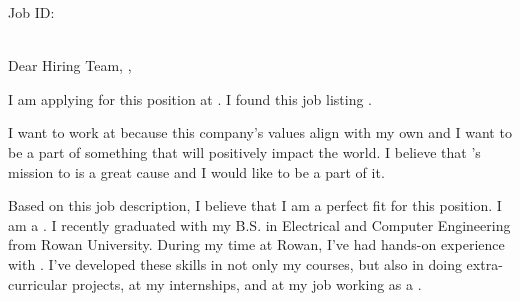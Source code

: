 \documentclass[11pt]{letter} %
\begin{document}
\begin{letter}
    {\companyaddress}
    {\ifdefempty{\jobid} {} {Job ID: \jobid\\~\\}}


\opening{
  Dear
\ifdefempty{\companyhiringmanager}
{Hiring Team,}
{\companyhiringmanager,}
}

I am applying for this {\jobterm} {\jobtitle} position at {\company}. I found
    this job listing {\joblisting}.

I want to work at {\company} because this company's values
align with my own and I want to be a part of something that will
positively impact the world. I believe that {\company}'s mission to
{\companymission} is a great cause and I would like to be a part of it.

Based on this job description, I believe that I am a perfect fit for this
position. I am a {\personaltag}.
I recently graduated with my B.S. in Electrical and Computer Engineering from
Rowan University. During my time at Rowan, I've had hands-on experience with
{\jobexperience}. I've developed these skills in not only my
courses, but also in doing extra-curricular projects, at my internships, and
at my job working as a {\previousjob}.

{\previousjobexperience}

{\deeppassion}


\end{letter}
\end{document}
